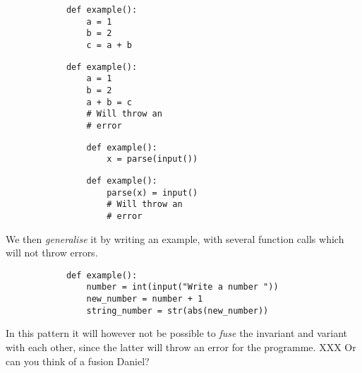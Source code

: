 \begin{enumerate}
            \hfill
     \begin{minipage}[t]{0.45\columnwidth}
        \begin{verbatim}
            def example():
                a = 1
                b = 2
                c = a + b  
        \end{verbatim}
    \end{minipage}
\hfill
    \begin{minipage}[t]{0.45\columnwidth}
        \begin{verbatim}
            def example():
                a = 1
                b = 2
                a + b = c 
                # Will throw an 
                # error  
        \end{verbatim}
    \end{minipage}
\hfill
\vspace{5pt}
\hfill 
        \begin{minipage}[t]{0.45\columnwidth}
            \begin{verbatim}
                def example():
                    x = parse(input())
            \end{verbatim}
        \end{minipage}
        \hfill
        \begin{minipage}[t]{0.45\columnwidth}
            \begin{verbatim}
                def example():
                    parse(x) = input() 
                    # Will throw an 
                    # error
            \end{verbatim}
        \end{minipage}
        \hfill
      
      We then \emph{generalise} it by writing an example, with several 
function calls which will not throw errors. 

        \begin{verbatim}
            def example():
                number = int(input("Write a number "))
                new_number = number + 1
                string_number = str(abs(new_number))
        \end{verbatim}
\hfill
      
      In this pattern it will however not be possible to \emph{fuse} the 
invariant and variant with each other, since the latter will throw 
an error for the programme. XXX Or can you think of a fusion Daniel?
\end{enumerate}


